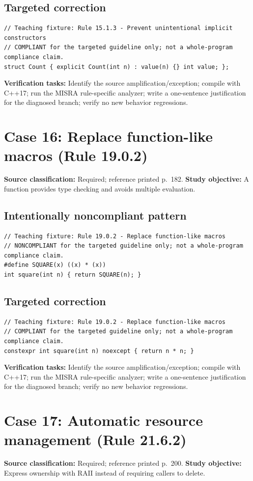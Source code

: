 \documentclass[10pt,letterpaper]{article}
\begin{document}
\subsection*{Targeted correction}
\begin{lstlisting}
// Teaching fixture: Rule 15.1.3 - Prevent unintentional implicit constructors
// COMPLIANT for the targeted guideline only; not a whole-program compliance claim.
struct Count { explicit Count(int n) : value(n) {} int value; };
\end{lstlisting}
\textbf{Verification tasks:} Identify the source amplification/exception; compile with C++17; run the MISRA rule-specific analyzer; write a one-sentence justification for the diagnosed branch; verify no new behavior regressions.

\section{Case 16: Replace function-like macros (Rule 19.0.2)}
\textbf{Source classification:} Required; reference printed p.~182. \textbf{Study objective:} A function provides type checking and avoids multiple evaluation.
\subsection*{Intentionally noncompliant pattern}
\begin{lstlisting}
// Teaching fixture: Rule 19.0.2 - Replace function-like macros
// NONCOMPLIANT for the targeted guideline only; not a whole-program compliance claim.
#define SQUARE(x) ((x) * (x))
int square(int n) { return SQUARE(n); }
\end{lstlisting}
\subsection*{Targeted correction}
\begin{lstlisting}
// Teaching fixture: Rule 19.0.2 - Replace function-like macros
// COMPLIANT for the targeted guideline only; not a whole-program compliance claim.
constexpr int square(int n) noexcept { return n * n; }
\end{lstlisting}
\textbf{Verification tasks:} Identify the source amplification/exception; compile with C++17; run the MISRA rule-specific analyzer; write a one-sentence justification for the diagnosed branch; verify no new behavior regressions.

\section{Case 17: Automatic resource management (Rule 21.6.2)}
\textbf{Source classification:} Required; reference printed p.~200. \textbf{Study objective:} Express ownership with RAII instead of requiring callers to delete.
\end{document}
